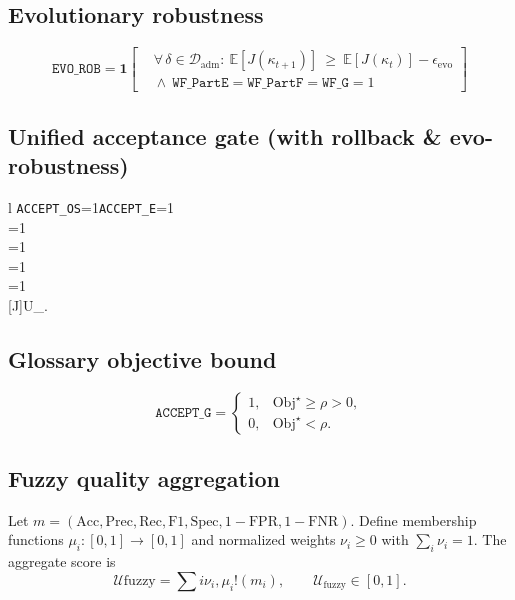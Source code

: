 \documentclass[conference]{IEEEtran}
\newcommand{\iverson}[1]{\mathbf{1}\!\left[#1\right]}
\begin{document}
\subsection{Evolutionary robustness}
\begin{equation}
\label{eq:evo-robust}
\mathtt{EVO\_ROB}=
\iverson{%
\begin{aligned}
&\forall\,\delta\in\mathcal{D}_{\mathrm{adm}}:\ 
  \mathbb{E}[J(\kappa_{t+1})]\ \ge\ \mathbb{E}[J(\kappa_t)]-\epsilon_{\mathrm{evo}}\\
&{}\wedge\ \mathtt{WF\_PartE}=\mathtt{WF\_PartF}=\mathtt{WF\_G}=1
\end{aligned}}
\end{equation}

\subsection{Unified acceptance gate (with rollback \& evo-robustness)}
\begin{IEEEeqnarray}{l}
\label{eq:accept-os}
\texttt{ACCEPT\_OS}=1\iff \texttt{ACCEPT\_E}=1\\
\qquad \wedge {}=1\\
\qquad \wedge {}=1\\
\qquad \wedge {}=1\\
\qquad \wedge {}=1\\
\qquad \wedge {}[J]\ge U_{\min}.
\end{IEEEeqnarray}

\subsection{Glossary objective bound}
\begin{equation}
\label{eq:gobj-bound}
\texttt{ACCEPT\_G}=
\begin{cases}
1, & \mathrm{Obj}^\star \ge \rho > 0,\\
0, & \mathrm{Obj}^\star < \rho.
\end{cases}
\end{equation}

\subsection{Fuzzy quality aggregation}
Let $m=(\mathrm{Acc},\mathrm{Prec},\mathrm{Rec},\mathrm{F1},\mathrm{Spec},1-\mathrm{FPR},1-\mathrm{FNR})$.
Define membership functions $\mu_i:[0,1]\to[0,1]$ and normalized weights $\nu_i\ge 0$ with $\sum_i \nu_i=1$. The aggregate score is
\begin{equation}
\label{eq:fuzzy-agg}
\mathcal{U}{\mathrm{fuzzy}}=\sum{i}\nu_i,\mu_i!\left(m_i\right),\qquad
\mathcal{U}_{\mathrm{fuzzy}}\in[0,1].
\end{equation}
\end{document}
